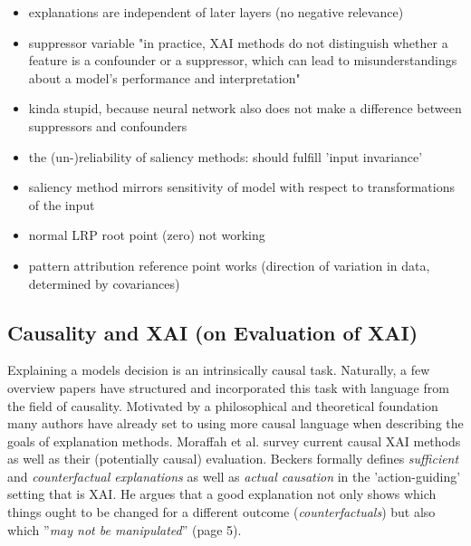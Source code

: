 \begin{itemize}
      \item explanations are independent of later layers (no negative relevance) \cite{Sixt2020}
      \item suppressor variable "in practice, XAI methods do not distinguish whether a feature is a confounder or a suppressor, which can lead to misunderstandings about a model's performance and interpretation"
      \item kinda stupid, because neural network also does not make a difference between suppressors and confounders \cite{Wilming2023}
      \item the (un-)reliability of saliency methods: should fulfill 'input invariance'
      \item saliency method mirrors sensitivity of model with respect to transformations of the input
      \item normal LRP root point (zero) not working
      \item pattern attribution reference point works (direction of variation in data, determined by covariances) \cite{Kindermans2019}
\end{itemize}


\subsection{Causality and XAI (on Evaluation of XAI)}\label{section:causal_xai}
Explaining a models decision is an intrinsically causal task. Naturally, a few overview papers have structured and incorporated this task with language from the field of causality. Motivated by a philosophical and theoretical foundation \cite{Woodward2004, Halpern2005, Schoelkopf2019} many authors have already set to using more causal language when describing the goals of explanation methods. Moraffah et al. \cite{Moraffah2020a} survey current causal XAI methods as well as their (potentially causal) evaluation. Beckers \cite{Beckers2022} formally defines \textit{sufficient} and \textit{counterfactual explanations} as well as \textit{actual causation} in the 'action-guiding' setting that is XAI. He argues that a good explanation not only shows which things ought to be changed for a different outcome (\textit{counterfactuals}) but also which ''\textit{may not be manipulated}'' (page 5). 


